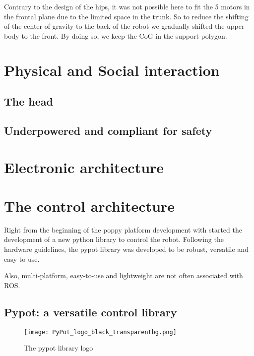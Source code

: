 Contrary to the design of the hips, it was not possible here to fit the 5 motors in the frontal plane due to the limited space in the trunk. So to reduce the shifting of the center of gravity to the back of the robot we gradually shifted the upper body to the front. By doing so, we keep the CoG in the support polygon.



\section{Physical and Social interaction} %



\subsection{The head} %

\subsection{Underpowered and compliant for safety} %



\section{Electronic architecture} %




\section{The control architecture} %


Right from the beginning of the poppy platform development with started the development of a new python library to control the robot.
Following the hardware guidelines, the pypot library was developed to be robust, versatile and easy to use.

Also, multi-platform, easy-to-use and lightweight are not often associated with ROS.


\subsection{Pypot: a versatile control library} %

\begin{figure}[tb]
    \begin{center}
        \texttt{[image: PyPot\_logo\_black\_transparentbg.png]}
    \end{center}
    \caption{The pypot library logo}
    \label{fig:pypot_logo}
\end{figure}



